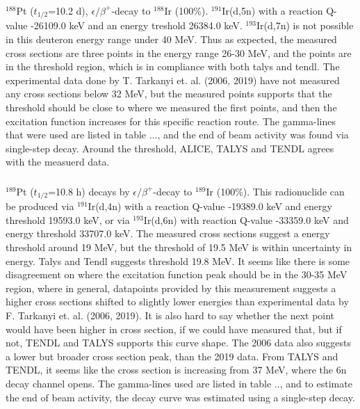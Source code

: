 \subsubsection{}
$^{188}$Pt ($t_{1/2}$=10.2 d), $\epsilon/\beta^+$-decay to $^{188}$Ir (100\%). $^{191}$Ir(d,5n) with a reaction Q-value -26109.0 keV and an energy treshold 26384.0 keV. $^{193}$Ir(d,7n) is not possible in this deuteron energy range under 40 MeV. Thus as expected, the measured cross sections are three points in the energy range 26-30 MeV, and the points are in the threshold region, which is in compliance with both talys and tendl. The experimental data done by T. Tarkanyi et. al. (2006, 2019) have not measured any cross sections below 32 MeV, but the measured points supports that the threshold should be close to where we measured the first points, and then the excitation function increases for this specific reaction route. The gamma-lines that were used are listed in table ..., and the end of beam activity was found via single-step decay.  Around the threshold, ALICE, TALYS and TENDL agrees with the measuerd data. 

\subsubsection{}
$^{189}$Pt ($t_{1/2}$=10.8 h) decays by $\epsilon/\beta^+$-decay to $^{189}$Ir (100\%). This radionuclide can be produced via $^{191}$Ir(d,4n) with a reaction Q-value -19389.0 keV and energy threshold 19593.0 keV, or via $^{193}$Ir(d,6n) with reaction Q-value -33359.0 keV and energy threshold 33707.0 keV. The measured cross sections suggest a energy threshold around 19 MeV, but the threshold of 19.5 MeV is within uncertainty in energy. Talys and Tendl suggests threshold 19.8 MeV. It seems like there is some disagreement on where the excitation function peak should be in the 30-35 MeV region, where in general, datapoints provided by this measurement suggests a higher cross sections shifted to slightly lower energies than experimental data by F. Tarkanyi et. al. (2006, 2019). It is also hard to say whether the next point would have been higher in cross section, if we could have measured that, but if not, TENDL and TALYS supports this curve shape. The 2006 data also suggests a lower but broader cross section peak, than the 2019 data. From TALYS and TENDL, it seems like the cross section is increasing from 37 MeV, where the 6n decay channel opens. The gamma-lines used are listed in table .., and to estimate the end of beam activity, the decay curve was estimated using a single-step decay. 

